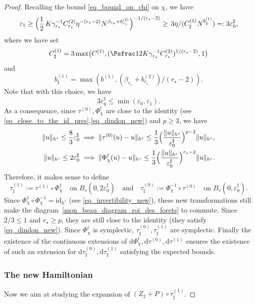 \begin{proof}
Recalling the bound \eqref{eq_bound_on_chi} on $\chi$, we have
\[
\varepsilon_1 \geq \Bigl(\frac12\, K \gamma_{r_\star}^{-1} C_{r_\star}^{(2)} \eta^{-(r_\star-2)} N^{\beta_{r_\star}+ b_{r_\star}^{(2)}}\Bigr)^{-1/(r_{\star}-2)} \geq \, 3 \eta /(C^{(1)}_\sharp N^{b^{(1)}_\sharp})=: 3 \varepsilon_0^\sharp,
\]
where we have set
\[
C^{(1)}_\sharp = 3 \max\bigl(C^{(1)}, (\Psfrac12 K \gamma_{r_\star}^{-1} C_{r_\star}^{(2)})^{1/(r_\star-2)},1\bigr)
\]
and
\[
b^{(1)}_{\sharp}=\max(b^{(1)},(\beta_{r_\star}+ b_{r_\star}^{(2)})/(r_{\star}-2)).
\]
Note that with this choice, we have
\[
3 \varepsilon_0^\sharp \leq \min(\varepsilon_0,\varepsilon_1).
\]
As a consequence, since $\tau^{(0)},\Phi_\chi^t$ are close to the identity (see \eqref{eq_close_to_the_id_pres},\eqref{eq_dindon_new}) and $p\geq 3$, we have
\begin{align*}
\| u \|_{h^s} \leq \frac83 \varepsilon_0^\sharp &\implies \|\tau^{(0)}(u)-u\|_{h^s} \leq \frac13 \Bigl(\frac{\|u\|_{h^s}}{\varepsilon_0^\sharp} \Bigr)^{p-2} \|u\|_{h^s},\\
\| u \|_{h^s} \leq 2 \varepsilon_0^\sharp &\implies \|\Phi_\chi^t(u)-u\|_{h^s} \leq \frac13 \Bigl(\frac{\|u\|_{h^s}}{\varepsilon_0^\sharp} \Bigr)^{r_\star-2} \|u\|_{h^s}.
\end{align*}
Therefore, it makes sense to define
\[
\tau^{(1)}_\sharp:= \tau^{(1)} \circ \Phi_\chi^1\quad \text{on } B_s(0,2 \varepsilon_0^\sharp)\quad \text{and} \quad \tau^{(0)}_\sharp:= \Phi_\chi^{-1}\circ \tau^{(0)}\quad \text{on } B_s(0, \varepsilon_0^\sharp).
\]
Since $\Phi_\chi^{1} \circ \Phi_\chi^{-1} =\mathrm{id}_{h^s}$ (see \eqref{eq_invertibility_new}), these new transformations still make the diagram~\eqref{mon_beau_diagram_roi_des_forets} to commute. Since $2/3\leq 1$ and $r_\star \geq p$, they are still close to the identity (\ie they satisfy \eqref{eq_dindon_new}). Since $\Phi_\chi^t$ is symplectic, $\tau^{(0)}_\sharp,\tau^{(1)}_\sharp$ are symplectic. Finally the existence of the continuous extensions of $\mathrm{d}\Phi_\chi^t,\mathrm{d} \tau^{(0)}, \mathrm{d} \tau^{(1)}$ ensures the existence of such an extension for $\mathrm{d}\tau^{(0)}_\sharp,\mathrm{d}\tau^{(1)}_\sharp$ satisfying the expected bounds.

\subsubsection*{The new Hamiltonian}
Now we aim at studying the expansion of $(Z_2+P)\circ \tau^{(1)}_\sharp$.


\end{proof}
